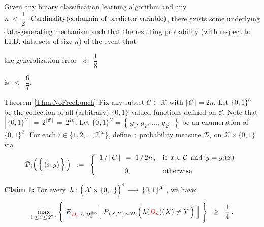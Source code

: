 
\newpage
\begin{remark}
\mbox{}\vskip 0.1cm
\noindent
Given any binary classification learning algorithm and
any \,$n \,<\, \dfrac{1}{2}\cdot\textnormal{Cardinality}(\textnormal{codomain of predictor variable})$,
there exists some underlying data-generating mechanism such that
the resulting probability (with respect to I.I.D. data sets of size $n$) of the event that
\begin{center}
the generalization error \,$<$\, $\dfrac{1}{8}$
\end{center}
is \,$\leq$\, $\dfrac{6}{7}$.
\end{remark}


\vskip 1.0cm
\proofof Theorem \ref{Thm:NoFreeLunch}
\vskip 0.3cm
\noindent
Fix any subset $\mathcal{C} \subset \mathcal{X}$ with $\vert\,\mathcal{C}\,\vert = 2n$.
Let $\{0,1\}^{\mathcal{C}}$ be the collection of all (arbitrary) $\{0,1\}$-valued functions defined on $\mathcal{C}$.
Note that $\left\vert\,\{0,1\}^{\mathcal{C}}\right\vert \,=\, 2^{\vert\,\mathcal{C}\,\vert} \, = \, 2^{2n}$.
Let $\{0,1\}^{\mathcal{C}} = \left\{\,g_{1},\, g_{2},\, \ldots,\, g_{2^{2n}}\,\right\}$ be an enumeration of $\{0,1\}^{\mathcal{C}}$.
For each $i \in \{1,2,\ldots,2^{2n}\}$, define a probability measure $\mathcal{D}_{i}$ on $\mathcal{X} \times \{0,1\}$ via
\begin{equation*}
\mathcal{D}_{i}\!\left(\,\left\{\,(x\overset{{\color{white}\vert}}{,}y)\,\right\}\,\right)
\;\; := \;\;
	\left\{\begin{array}{cl}
		1\,/\,\vert\,C\,\vert\, \;=\; 1\,/\,2n\,, & \textnormal{if \,$x \in \mathcal{C}$\, and \,$y = g_{i}(x)$} \\
		\overset{{\color{white}\vert}}{0}, & \textnormal{otherwise}
		\end{array}\right.
\end{equation*}

\vskip 0.5cm
\noindent
\textbf{Claim 1:}\quad
For every
\,$h : \left(\,\mathcal{X}\overset{{\color{white}.}}{\times}\{0,1\}\right)^{n} \longrightarrow \,\{0,1\}^{\mathcal{X}}$\,,
we have:
\begin{equation*}
\underset{1 \,\leq\, i \,\leq\, 2^{2n}}{\max}\left\{\;
	\overset{{\color{white}\vert}}{E}_{{\color{red}D_{n}}\,\sim\,\mathcal{D}_{i}^{\otimes n}}\!\left[\;
		P_{\,(X,Y)\,\sim\,\mathcal{D}_{i}}\!\left(\,h({\color{red}D_{n}})(X) \overset{{\color{white}.}}{\neq} Y\,\right)
		\;\right]
	\;\right\}
	\;\; \geq \;\;
		\dfrac{1}{4}\,.
\end{equation*}


